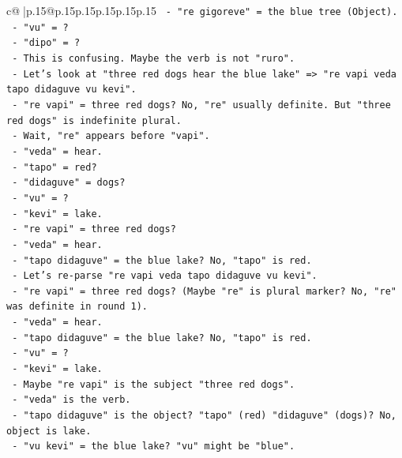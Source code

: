 \documentclass{article}
\begin{document}
{\begin{supertabular}{c@{$\;$}|p{.15\linewidth}@{}p{.15\linewidth}p{.15\linewidth}p{.15\linewidth}p{.15\linewidth}p{.15\linewidth}}
{{{\texttt{           {-} "re gigoreve" = the blue tree (Object).} \\
\texttt{           {-} "vu" = ?} \\
\texttt{           {-} "dipo" = ?} \\
\texttt{           {-} This is confusing. Maybe the verb is not "ruro".} \\
\texttt{           {-} Let's look at "three red dogs hear the blue lake" => "re vapi veda tapo didaguve vu kevi".} \\
\texttt{             {-} "re vapi" = three red dogs? No, "re" usually definite. But "three red dogs" is indefinite plural.} \\
\texttt{             {-} Wait, "re" appears before "vapi".} \\
\texttt{             {-} "veda" = hear.} \\
\texttt{             {-} "tapo" = red?} \\
\texttt{             {-} "didaguve" = dogs?} \\
\texttt{             {-} "vu" = ?} \\
\texttt{             {-} "kevi" = lake.} \\
\texttt{             {-} "re vapi" = three red dogs?} \\
\texttt{             {-} "veda" = hear.} \\
\texttt{             {-} "tapo didaguve" = the blue lake? No, "tapo" is red.} \\
\texttt{             {-} Let's re{-}parse "re vapi veda tapo didaguve vu kevi".} \\
\texttt{               {-} "re vapi" = three red dogs? (Maybe "re" is plural marker? No, "re" was definite in round 1).} \\
\texttt{               {-} "veda" = hear.} \\
\texttt{               {-} "tapo didaguve" = the blue lake? No, "tapo" is red.} \\
\texttt{               {-} "vu" = ?} \\
\texttt{               {-} "kevi" = lake.} \\
\texttt{               {-} Maybe "re vapi" is the subject "three red dogs".} \\
\texttt{               {-} "veda" is the verb.} \\
\texttt{               {-} "tapo didaguve" is the object? "tapo" (red) "didaguve" (dogs)? No, object is lake.} \\
\texttt{               {-} "vu kevi" = the blue lake? "vu" might be "blue".} \\
}}}
\end{supertabular}}
\end{document}
